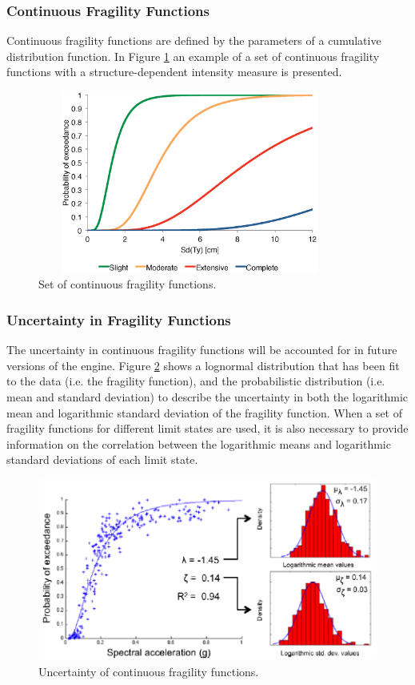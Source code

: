 \subsubsection{Continuous Fragility Functions}
Continuous \glspl{fragility function} are defined by the parameters of a cumulative distribution function. In Figure \ref{fig:FFcontinuous} an example of a set of continuous fragility functions with a structure-dependent intensity measure is presented. 

\begin{figure}[ht]
\centering
\includegraphics[width=10cm,height=6cm]{./figures/risk/FFContinuous.eps}
\caption{Set of continuous fragility functions.}
\label{fig:FFcontinuous}
\end{figure}

\color{blue}
\subsubsection{Uncertainty in Fragility Functions}
The uncertainty in continuous \glspl{fragility function} will be accounted for in future versions of the engine. Figure \ref{fig:FF_uncertainty} shows a lognormal distribution that has been fit to the data (i.e. the fragility function), and the probabilistic distribution (i.e. mean and standard deviation) to describe the uncertainty in both the logarithmic mean and logarithmic standard deviation of the fragility function. When a set of \glspl{fragility function} for different limit states are used, it is also necessary to provide information on the correlation between the logarithmic means and logarithmic standard deviations of each limit state.

\begin{figure}[ht]
\centering
\includegraphics[width=12cm,height=6cm]{./figures/risk/FFuncertainty.eps}
\caption{Uncertainty of continuous fragility functions.}
\label{fig:FF_uncertainty}
\end{figure}


